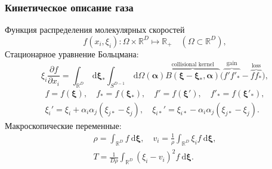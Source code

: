 \documentclass[mathserif]{beamer} %
\newcommand{\dd}{\:\mathrm{d}}
\newcommand{\pder}[2][]{\frac{\partial#1}{\partial#2}}
\newcommand{\dxi}{\boldsymbol{\dd\xi}}
\newcommand{\bxi}{\boldsymbol{\xi}}
\begin{document}
\begin{frame}
    \frametitle{Кинетическое описание газа}
    Функция распределения молекулярных скоростей
    \begin{equation}
        f(x_i,\xi_i): \Omega\times\mathbb{R}^D\mapsto\mathbb{R}_+
        \quad (\Omega\subset\mathbb{R}^D),
    \end{equation}
    \pause
    Стационарное уравнение Больцмана:
    \begin{equation}
        \xi_i\pder[f]{x_i} = \int_{\mathbb{R}^D}\dxi_* \int_{S^{D-1}} \dd\Omega(\boldsymbol{\alpha})
        \overbrace{B(\bxi-\bxi_*,\boldsymbol{\alpha})}^\text{collisional kernel}
        \Big( \overbrace{f'f'_*}^\text{gain} - \overbrace{ff_*}^\text{loss} \Big),
    \end{equation}
    \begin{gather*}
        f=f(\bxi), \quad f_*=f(\bxi_*), \quad f'=f(\bxi'), \quad f'_*=f(\bxi'_*), \\
        \xi_i' = \xi_i+\alpha_i\alpha_j \left(\xi_{j*}-\xi_j\right), \quad
        \xi_{i*}' = \xi_{i*}-\alpha_i\alpha_j \left(\xi_{j*}-\xi_j\right).
    \end{gather*}
    \pause
    Макроскопические переменные:
    \begin{equation}
        \begin{gathered}
        \rho = \int_{\mathbb{R}^D} f\dxi, \quad
        v_i = \frac1\rho\int_{\mathbb{R}^D} \xi_i f\dxi, \\
        T = \frac1{D\rho}\int_{\mathbb{R}^D} \left(\xi_i - v_i\right)^2 f\dxi.
        \end{gathered}
    \end{equation}
\end{frame}
\end{document}

